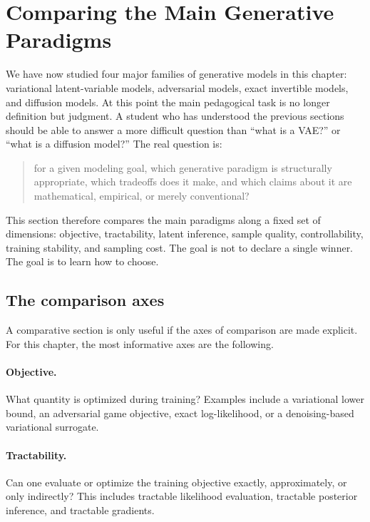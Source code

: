 
\section{Comparing the Main Generative Paradigms}

We have now studied four major families of generative models in this chapter:
variational latent-variable models, adversarial models, exact invertible models, and diffusion models.
At this point the main pedagogical task is no longer definition but judgment.
A student who has understood the previous sections should be able to answer a more difficult question than ``what is a VAE?'' or ``what is a diffusion model?''
The real question is:

\begin{quote}
for a given modeling goal, which generative paradigm is structurally appropriate, which tradeoffs does it make, and which claims about it are mathematical, empirical, or merely conventional?
\end{quote}

This section therefore compares the main paradigms along a fixed set of dimensions:
objective, tractability, latent inference, sample quality, controllability, training stability, and sampling cost.
The goal is not to declare a single winner.
The goal is to learn how to choose.

\subsection*{The comparison axes}

A comparative section is only useful if the axes of comparison are made explicit.
For this chapter, the most informative axes are the following.

\paragraph{Objective.}
What quantity is optimized during training?
Examples include a variational lower bound, an adversarial game objective, exact log-likelihood, or a denoising-based variational surrogate.

\paragraph{Tractability.}
Can one evaluate or optimize the training objective exactly, approximately, or only indirectly?
This includes tractable likelihood evaluation, tractable posterior inference, and tractable gradients.

